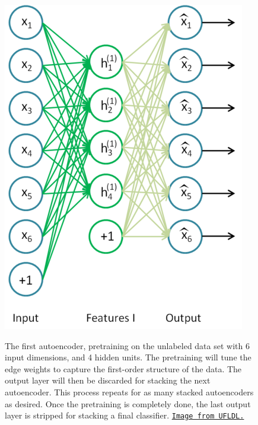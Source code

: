 \documentclass[12pt]{article}  %
\begin{document}
\begin{figure}[H]
\centering
\begin{minipage}{.45\linewidth}
\includegraphics[scale=1]{images/deep_1.png}\\
\caption{The first autoencoder, pretraining on the unlabeled data set with 6 input dimensions, and 4 hidden units. The pretraining will tune the edge weights to capture the first-order structure of the data. The output layer will then be discarded for stacking the next autoencoder. This process repeats for as many stacked autoencoders as desired. Once the pretraining is completely done, the last output layer is stripped for stacking a final classifier. \href{http://deeplearning.stanford.edu/wiki/index.php/Stacked_Autoencoders}{\tt Image from UFLDL.}}\label{deep1}
\end{minipage}
\hspace{.05\linewidth}
\begin{minipage}{.45\linewidth}

\end{minipage}
\end{figure}
\end{document}
